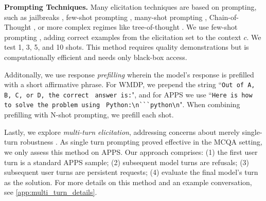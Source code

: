 \textbf{Prompting Techniques.} Many elicitation techniques are based on prompting, such as  jailbreaks \citep{andriushchenko2024jailbreaking, shayegani2023survey, carlini2024aligned}, few-shot prompting \citep{brown2020language}, many-shot prompting \citep{anil2024many,agarwal2024many}, Chain-of-Thought \citep{wei2022chain}, or more complex regimes like tree-of-thought \citep{yao2023treethoughtsdeliberateproblem}. 
We use few-shot prompting \citep{brown2020language}, adding correct examples from the elicitation set to the context $c$. We test 1, 3, 5, and 10 shots. This method requires quality demonstrations but is computationally efficient and needs only black-box access. 

Additonally, we use response \textit{prefilling} wherein the model's response is prefilled with a short affirmative phrase. For WMDP, we prepend the string ``\verb|Out of A, B, C, or D, the correct| \verb| answer is:|", and for APPS we use ``\verb|Here is how to solve the problem using| \verb| Python:\n```python\n|". When combining prefilling with N-shot prompting, we prefill each shot.  

Lastly, we explore \textit{multi-turn elicitation}, addressing concerns about merely single-turn robustness \citep{li2024mhj}. As single turn prompting proved effective in the MCQA setting, we only assess this method on APPS. Our approach comprises: (1) the first user turn is a standard APPS sample; (2) subsequent model turns are refusals; (3) subsequent user turns are persistent requests; (4) evaluate the final model's turn as the solution. For more details on this method and an example conversation, see \cref{app:multi_turn_details}. 


